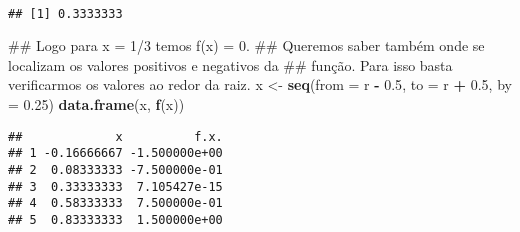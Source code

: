\documentclass[]{book}
\newenvironment{Shaded}{\begin{snugshade}}{\end{snugshade}}
\newcommand{\KeywordTok}[1]{\textcolor[rgb]{0.13,0.29,0.53}{\textbf{#1}}}
\newcommand{\DataTypeTok}[1]{\textcolor[rgb]{0.13,0.29,0.53}{#1}}
\newcommand{\DecValTok}[1]{\textcolor[rgb]{0.00,0.00,0.81}{#1}}
\newcommand{\FloatTok}[1]{\textcolor[rgb]{0.00,0.00,0.81}{#1}}
\newcommand{\StringTok}[1]{\textcolor[rgb]{0.31,0.60,0.02}{#1}}
\newcommand{\CommentTok}[1]{\textcolor[rgb]{0.56,0.35,0.01}{\textit{#1}}}
\newcommand{\ControlFlowTok}[1]{\textcolor[rgb]{0.13,0.29,0.53}{\textbf{#1}}}
\newcommand{\OperatorTok}[1]{\textcolor[rgb]{0.81,0.36,0.00}{\textbf{#1}}}
\newcommand{\NormalTok}[1]{#1}
\begin{document}
\begin{enumerate}
  ~

\begin{Shaded}
\end{Shaded}

\begin{verbatim}
## [1] 0.3333333
\end{verbatim}

\begin{Shaded}
\begin{Highlighting}[]
\NormalTok{##  Logo para x = 1/3 temos f(x) = 0.}
\NormalTok{##  Queremos saber também onde se localizam os valores positivos e negativos da}
\NormalTok{## função. Para isso basta verificarmos os valores ao redor da raiz.}
\NormalTok{x <-}\StringTok{ }\KeywordTok{seq}\NormalTok{(}\DataTypeTok{from =}\NormalTok{ r }\OperatorTok{-}\StringTok{ }\FloatTok{0.5}\NormalTok{, }\DataTypeTok{to =}\NormalTok{ r }\OperatorTok{+}\StringTok{ }\FloatTok{0.5}\NormalTok{, }\DataTypeTok{by =} \FloatTok{0.25}\NormalTok{)}
\KeywordTok{data.frame}\NormalTok{(x, }\KeywordTok{f}\NormalTok{(x))}
\end{Highlighting}
\end{Shaded}

\begin{verbatim}
##             x          f.x.
## 1 -0.16666667 -1.500000e+00
## 2  0.08333333 -7.500000e-01
## 3  0.33333333  7.105427e-15
## 4  0.58333333  7.500000e-01
## 5  0.83333333  1.500000e+00
\end{verbatim}


\end{enumerate}
\end{document}
